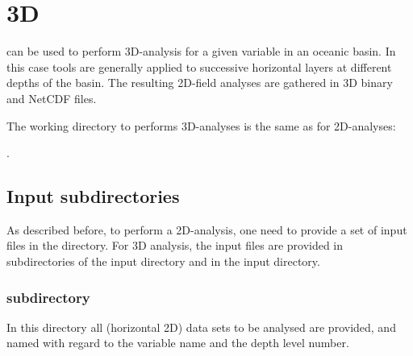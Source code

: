 \chapter{\diva 3D\label{chap:diva3D}}

\diva  can be used to perform 3D-analysis  for a given variable in an oceanic basin. In this case \diva tools are generally applied to successive horizontal layers at different depths of the basin. The resulting 2D-field analyses are gathered in 3D binary and NetCDF files.

The working directory to performs 3D-analyses is the same as for 2D-analyses:\par \underline{}.


\minitoc

\section{Input subdirectories}

As described before, to perform a 2D-analysis, one need to provide a set of input files in the   directory. For 3D analysis, the input files are provided in subdirectories of the input directory and in the input directory.

\subsection[DIVA3D/divastripped/input/divadata directory]{ subdirectory}

In this directory all (horizontal 2D) data sets to be analysed are provided, and named with regard to the variable name and the depth level  number.


\begin{center}
\end{center}

